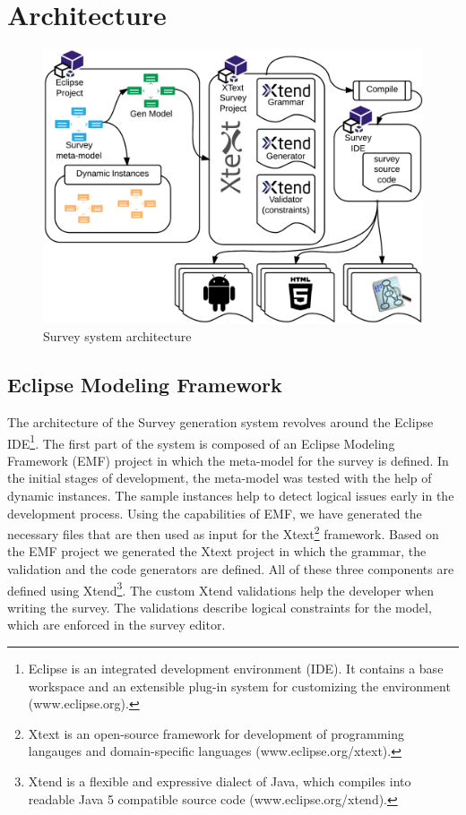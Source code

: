 \documentclass[runningheads,a4paper]{llncs}
\begin{document}
\section{Architecture}
\begin{figure}[htb]
	\centering
	\includegraphics[scale=0.23]{images/survey_dsl_architecture}
	\caption{Survey system architecture}
	\label{fig:survey_system_architecture}
\end{figure}

\subsection{Eclipse Modeling Framework}
The architecture of the Survey generation system revolves around the Eclipse IDE\footnote{Eclipse is an integrated development environment (IDE). It contains a base workspace and an extensible plug-in system for customizing the environment (www.eclipse.org).}.
The first part of the system is composed of an Eclipse Modeling Framework (EMF) project in which the meta-model for the survey is defined. In the initial stages of development, the meta-model was tested with the help of dynamic instances. The sample instances help to detect logical issues early in the development process. Using the capabilities of EMF, we have generated the necessary files that are then used as input for the Xtext\footnote{Xtext is an open-source framework for development of programming langauges and domain-specific languages (www.eclipse.org/xtext).} framework.
Based on the EMF project we generated  the Xtext project in which the grammar, the validation and the code generators are defined. All of these three components are defined using Xtend\footnote{Xtend is a flexible and expressive dialect of Java, which compiles into readable Java 5 compatible source code (www.eclipse.org/xtend).}. The custom Xtend validations help the developer when writing the survey. The validations describe logical constraints for the model, which are enforced in the survey editor.
\end{document}
